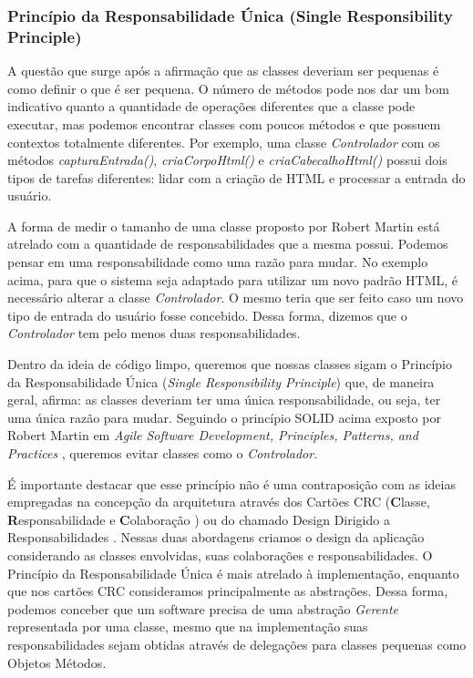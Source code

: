 \subsubsection{Princípio da Responsabilidade Única (Single Responsibility Principle)}
A questão que surge após a afirmação que as classes deveriam ser pequenas é como definir o que é ser pequena. O número de métodos pode nos dar um bom indicativo quanto a quantidade de operações diferentes que a classe pode executar, mas podemos encontrar classes com poucos métodos e que possuem contextos totalmente diferentes. Por exemplo, uma classe \textit{Controlador} com os métodos \textit{capturaEntrada()}, \textit{criaCorpoHtml()} e \textit{criaCabecalhoHtml()} possui dois tipos de tarefas diferentes: lidar com a criação de HTML e processar a entrada do usuário.
	
A forma de medir o tamanho de uma classe proposto por Robert Martin está atrelado com a quantidade de responsabilidades que a mesma possui. Podemos pensar em uma responsabilidade como uma razão para mudar. No exemplo acima, para que o sistema seja adaptado para utilizar um novo padrão HTML, é necessário alterar a classe \textit{Controlador}. O mesmo teria que ser feito caso um novo tipo de entrada do usuário fosse concebido. Dessa forma, dizemos que o \textit{Controlador} tem pelo menos duas responsabilidades.
	
Dentro da ideia de código limpo, queremos que nossas classes sigam o Princípio da Responsabilidade Única (\textit{Single Responsibility Principle}) que, de maneira geral, afirma: as classes deveriam ter uma única responsabilidade, ou seja, ter uma única razão para mudar. Seguindo o princípio SOLID acima exposto por Robert Martin em \textit{Agile Software Development, Principles, Patterns, and Practices} \citep{Martin2002}, queremos evitar classes como o \textit{Controlador}.

É importante destacar que esse princípio não é uma contraposição com as ideias empregadas na concepção da arquitetura através dos Cartões CRC (\textbf{C}lasse, \textbf{R}esponsabilidade e \textbf{C}olaboração \citep{crc89})  ou do chamado Design Dirigido a Responsabilidades \citep{Wirfs-Brock03}. Nessas duas abordagens criamos o design da aplicação considerando as classes envolvidas, suas colaborações e responsabilidades. O Princípio da Responsabilidade Única é mais atrelado à implementação, enquanto que nos cartões CRC consideramos principalmente as abstrações. Dessa forma, podemos conceber que um software precisa de uma abstração \textit{Gerente} representada por uma classe, mesmo que na implementação suas responsabilidades sejam obtidas através de delegações para classes pequenas como Objetos Métodos.

